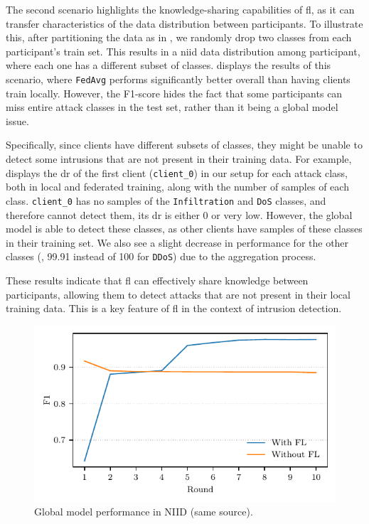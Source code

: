 The second scenario highlights the knowledge-sharing capabilities of \gls{fl}, as it can transfer characteristics of the data distribution between participants.
To illustrate this, after partitioning the data as in , we randomly drop two classes from each participant's train set.
This results in a \gls{niid} data distribution among participant, where each one has a different subset of classes.
 displays the results of this scenario, where \texttt{FedAvg} performs significantly better overall than having clients train locally.
However, the F1-score hides the fact that some participants can miss entire attack classes in the test set, rather than it being a global model issue.

Specifically, since clients have different subsets of classes, they might be unable to detect some intrusions that are not present in their training data.
For example,  displays the \gls{dr} of the first client (\texttt{client\_0}) in our setup for each attack class, both in local and federated training, along with the number of samples of each class.
\texttt{client\_0} has no samples of the \texttt{Infiltration} and \texttt{DoS} classes, and therefore cannot detect them, \ie its \gls{dr} is either 0 or very low.
However, the global model is able to detect these classes, as other clients have samples of these classes in their training set.
We also see a slight decrease in performance for the other classes (\eg, 99.91 instead of 100 for \texttt{DDoS}) due to the aggregation process.

These results indicate that \gls{fl} can effectively share knowledge between participants, allowing them to detect attacks that are not present in their local training data.
This is a key feature of \gls{fl} in the context of intrusion detection.

\begin{figure}
    \centering
    \includegraphics{figures/niid.pdf}
    \caption{Global model performance in NIID (same source).}
    \label{fig:niid}
\end{figure}

